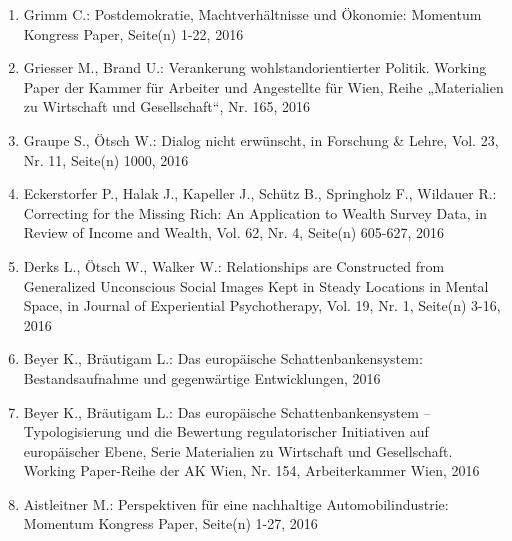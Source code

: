 \begin{enumerate}
	 \item Grimm C.: Postdemokratie, Machtverhältnisse und Ökonomie: Momentum Kongress Paper, Seite(n) 1-22, 2016
	 \item Griesser M., Brand U.: Verankerung wohlstandorientierter Politik. Working Paper der Kammer für Arbeiter und Angestellte für Wien, Reihe „Materialien zu Wirtschaft und Gesellschaft“, Nr. 165, 2016
	 \item Graupe S., Ötsch W.: Dialog nicht erwünscht, in Forschung & Lehre, Vol. 23, Nr. 11, Seite(n) 1000, 2016
	 \item Eckerstorfer P., Halak J., Kapeller J., Schütz B., Springholz F., Wildauer R.: Correcting for the Missing Rich: An Application to Wealth Survey Data, in Review of Income and Wealth, Vol. 62, Nr. 4, Seite(n) 605-627, 2016
	 \item Derks L., Ötsch W., Walker W.: Relationships are Constructed from Generalized Unconscious Social Images Kept in Steady Locations in Mental Space, in Journal of Experiential Psychotherapy, Vol. 19, Nr. 1, Seite(n) 3-16, 2016
	 \item Beyer K., Bräutigam L.: Das europäische Schattenbankensystem: Bestandsaufnahme und gegenwärtige Entwicklungen, 2016
	 \item Beyer K., Bräutigam L.: Das europäische Schattenbankensystem – Typologisierung und die Bewertung regulatorischer Initiativen auf europäischer Ebene, Serie Materialien zu Wirtschaft und Gesellschaft. Working Paper-Reihe der AK Wien, Nr. 154, Arbeiterkammer Wien, 2016
	 \item Aistleitner M.: Perspektiven für eine nachhaltige Automobilindustrie: Momentum Kongress Paper, Seite(n) 1-27, 2016
\end{enumerate}
